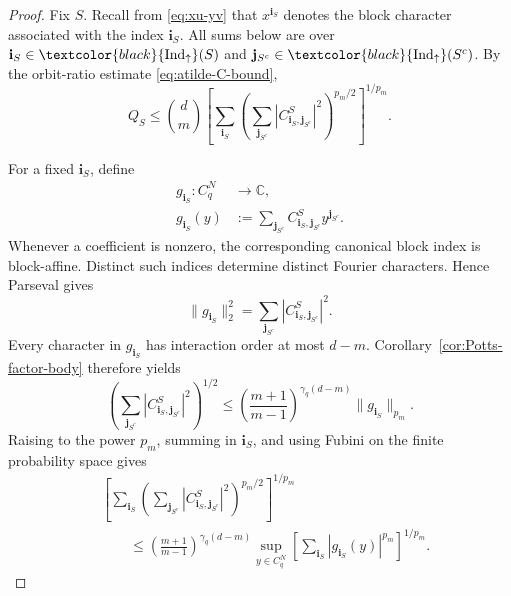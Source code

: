\documentclass[11pt,a4paper]{article}
\numberwithin{equation}{section}
\theoremstyle{cleanplain}
\theoremstyle{cleandefinition}
\theoremstyle{cleanremark}
\newcommand{\C}{\mathbb C}
\newcommand{\Indup}{\textcolor{black}{\operatorname{Ind}_{\uparrow}}}
\begin{document}
\begin{proof}
Fix $S$.  Recall from \eqref{eq:xu-yv} that $x^{\mathbf i_S}$ denotes the
block character associated with the index $\mathbf i_S$.  All sums below are over
$\mathbf i_S\in\Indup(S)$ and
$\mathbf j_{S^c}\in\Indup(S^c)$.
By the orbit-ratio estimate \eqref{eq:atilde-C-bound},
\begin{equation}\label{eq:QS-orbit}
 Q_S\leq\binom dm
 \left[
 \sum_{\mathbf i_S}
 \left(
 \sum_{\mathbf j_{S^c}}|C^S_{\mathbf i_S,\mathbf j_{S^c}}|^2
 \right)^{p_m/2}
 \right]^{1/p_m}.
\end{equation}

For a fixed $\mathbf i_S$, define
\begin{equation}\label{eq:gu}
 \begin{aligned}
 g_{\mathbf i_S}:C_q^N&\longrightarrow\C,\\
 g_{\mathbf i_S}(y)&:=
 \sum_{\mathbf j_{S^c}}
 C^S_{\mathbf i_S,\mathbf j_{S^c}}y^{\mathbf j_{S^c}}.
 \end{aligned}
\end{equation}
Whenever a coefficient is nonzero, the corresponding canonical block index
is block-affine.  Distinct such indices determine distinct Fourier
characters.  Hence Parseval gives
\begin{equation}\label{eq:Parseval-gu}
 \|g_{\mathbf i_S}\|_2^2
 =\sum_{\mathbf j_{S^c}}|C^S_{\mathbf i_S,\mathbf j_{S^c}}|^2.
\end{equation}
Every character in $g_{\mathbf i_S}$ has interaction order at most $d-m$.
Corollary~\ref{cor:Potts-factor-body} therefore yields
\begin{equation}\label{eq:Potts-gu}
 \left(\sum_{\mathbf j_{S^c}}|C^S_{\mathbf i_S,\mathbf j_{S^c}}|^2\right)^{1/2}
 \leq
 \left(\frac{m+1}{m-1}\right)^{\gamma_q(d-m)}
 \|g_{\mathbf i_S}\|_{p_m}.
\end{equation}
Raising to the power $p_m$, summing in $\mathbf i_S$, and using Fubini on
the finite probability space gives
\begin{equation}\label{eq:Fubini-step}
\begin{aligned}
 &\left[
 \sum_{\mathbf i_S}
 \left(\sum_{\mathbf j_{S^c}}|C^S_{\mathbf i_S,\mathbf j_{S^c}}|^2\right)^{p_m/2}
 \right]^{1/p_m}\\
 &\qquad\leq
 \left(\frac{m+1}{m-1}\right)^{\gamma_q(d-m)}
 \sup_{y\in C_q^N}
 \left[
 \sum_{\mathbf i_S}|g_{\mathbf i_S}(y)|^{p_m}
 \right]^{1/p_m}.
\end{aligned}
\end{equation}


\end{proof}
\end{document}

